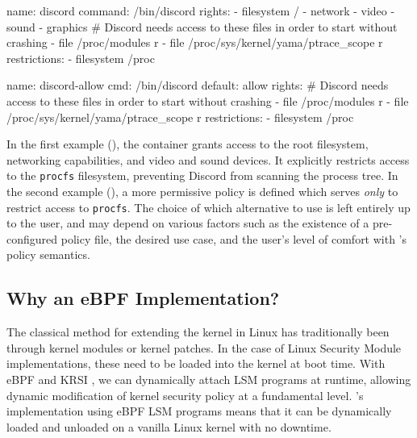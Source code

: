 \begin{listing}[
  language=yaml,
  caption={
    A sample manifest for Discord \cite{discord} using \bpfcontain{}'s more
    restrictive default-deny confinement. All accesses which are not listed
    under the container's rights are implictly denied. The explicit restriction
    on access to \texttt{procfs} prevents Discord from scanning the process
    tree, regardless of its rights.
  },
  label={lst:discord_a},
  gobble=2]
  name: discord
  command: /bin/discord
  rights:
    - filesystem /
    - network
    - video
    - sound
    - graphics
    # Discord needs access to these files in order to start without crashing
    - file /proc/modules r
    - file /proc/sys/kernel/yama/ptrace_scope r
  restrictions:
    - filesystem /proc
\end{listing}

\begin{listing}[
  language=yaml,
  caption={
    A sample manifest for Discord \cite{discord} using \bpfcontain{}'s optional
    default-allow confinement.  This permits a much simpler policy that directly
    targets Discord's \texttt{procfs} scanning behaviour.
  },
  label={lst:discord_b},
  gobble=2]
  name: discord-allow
  cmd: /bin/discord
  default: allow
  rights:
    # Discord needs access to these files in order to start without crashing
    - file /proc/modules r
    - file /proc/sys/kernel/yama/ptrace_scope r
  restrictions:
    - filesystem /proc
\end{listing}

In the first example (), the container grants access to the
root filesystem, networking capabilities, and video and sound devices. It
explicitly restricts access to the \texttt{procfs} filesystem, preventing
Discord from scanning the process tree. In the second example
(), a more permissive policy is defined which serves
\textit{only} to restrict access to \texttt{procfs}. The choice of which
alternative to use is left entirely up to the user, and may depend on various
factors such as the existence of a pre-configured policy file, the desired use
case, and the user's level of comfort with \bpfcontain{}'s policy semantics.

\subsection{Why an eBPF Implementation?}%
\label{sub:why_ebpf}

The classical method for extending the kernel in Linux has traditionally been through kernel modules or kernel patches. In the case of Linux Security Module implementations, these need to be loaded into the kernel at boot time. With eBPF and KRSI \cite{singh2019_krsi,corbet2019_krsi}, we can dynamically attach LSM programs at runtime, allowing dynamic modification of kernel security policy at a fundamental level. \bpfcontain{}'s implementation using eBPF LSM programs means that it can be dynamically loaded and unloaded on a vanilla Linux kernel with no downtime.

